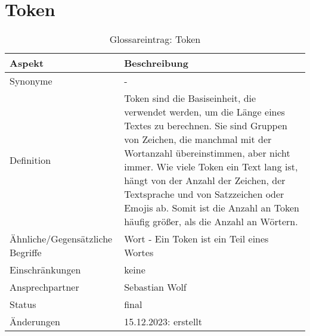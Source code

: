 \section*{Token}\label{sec:glossar_token}
\begin{table}[H]
    \label{tab:glossar_token}
    \begin{tabularx}{\textwidth}{|l|X|}
        \hline
        \textbf{Aspekt}                  & \textbf{Beschreibung}                      \\
        \hline
        Synonyme                         & -                                          \\
        \hline
        Definition & Token sind die Basiseinheit, die verwendet werden,
        um die Länge eines Textes zu berechnen.
        Sie sind Gruppen von Zeichen, die manchmal mit der Wortanzahl übereinstimmen,
        aber nicht immer.
        Wie viele Token ein Text lang ist, hängt von der Anzahl der Zeichen,
        der Textsprache und von Satzzeichen oder Emojis ab.
        Somit ist die Anzahl an Token häufig größer, als die Anzahl an Wörtern. \\
        \hline
        Ähnliche/Gegensätzliche Begriffe & Wort - Ein Token ist ein Teil eines Wortes \\
        \hline
        Einschränkungen                  & keine                                      \\
        \hline
        Ansprechpartner                  & Sebastian Wolf                             \\
        \hline
        Status                           & final                                      \\
        \hline
        Änderungen                       & 15.12.2023: erstellt                       \\
        \hline
    \end{tabularx}
    \caption{Glossareintrag: Token}
\end{table}
